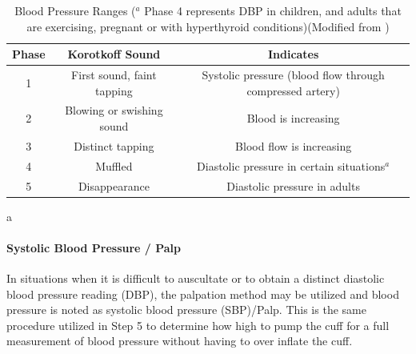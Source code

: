 \begin{table}[h!]
\centering
\begin{tabular}{||c c c ||} 
 \hline
 Phase & Korotkoff Sound & Indicates \\ [0.5ex] 
 \hline\hline
1  & First sound, faint tapping  & Systolic pressure (blood flow through compressed artery)  \\ 
2  & Blowing or swishing sound  & Blood is increasing   \\
3 & Distinct tapping   & Blood flow is increasing   \\
4 & Muffled  & Diastolic pressure in certain situations$^a$\\
5 & Disappearance  & Diastolic pressure in adults   \\ [1ex] 
 \hline
\end{tabular}
\caption{Blood Pressure Ranges ($^a$ \footnotesize{Phase 4 represents DBP in children, and adults that are exercising, pregnant or with hyperthyroid conditions})(Modified from \cite{bickley_bates_2012})}a
\label{Korotkoff}
\end{table}

\paragraph{Systolic Blood Pressure / Palp}

In situations when it is difficult to auscultate or to obtain a distinct diastolic blood pressure reading (DBP), the palpation method may be utilized and blood pressure is noted as systolic blood pressure (SBP)/Palp. This is the same procedure utilized in Step 5 to determine how high to pump the cuff for a full measurement of blood pressure without having to over inflate the cuff.


